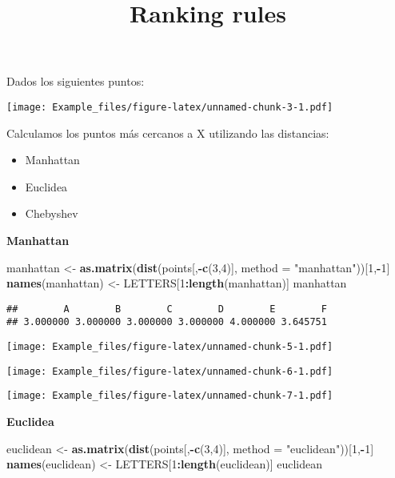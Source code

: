 \documentclass[]{article}
\title{Ranking rules}
\author{}
\date{}
\newenvironment{Shaded}{\begin{snugshade}}{\end{snugshade}}
\newcommand{\DataTypeTok}[1]{\textcolor[rgb]{0.13,0.29,0.53}{#1}}
\newcommand{\DecValTok}[1]{\textcolor[rgb]{0.00,0.00,0.81}{#1}}
\newcommand{\KeywordTok}[1]{\textcolor[rgb]{0.13,0.29,0.53}{\textbf{#1}}}
\newcommand{\NormalTok}[1]{#1}
\newcommand{\OperatorTok}[1]{\textcolor[rgb]{0.81,0.36,0.00}{\textbf{#1}}}
\newcommand{\StringTok}[1]{\textcolor[rgb]{0.31,0.60,0.02}{#1}}
\providecommand{\tightlist}{%
  \setlength{\itemsep}{0pt}\setlength{\parskip}{0pt}}
\begin{document}
\maketitle

Dados los siguientes puntos:

\texttt{[image: Example\_files/figure-latex/unnamed-chunk-3-1.pdf]}

Calculamos los puntos más cercanos a X utilizando las distancias:

\begin{itemize}
\tightlist
\item
  Manhattan
\item
  Euclidea
\item
  Chebyshev
\end{itemize}

\textbf{Manhattan}

\begin{Shaded}
\begin{Highlighting}[]
\NormalTok{manhattan <-}\StringTok{ }\KeywordTok{as.matrix}\NormalTok{(}\KeywordTok{dist}\NormalTok{(points[,}\OperatorTok{-}\KeywordTok{c}\NormalTok{(}\DecValTok{3}\NormalTok{,}\DecValTok{4}\NormalTok{)], }\DataTypeTok{method =} \StringTok{"manhattan"}\NormalTok{))[}\DecValTok{1}\NormalTok{,}\OperatorTok{-}\DecValTok{1}\NormalTok{]}
\KeywordTok{names}\NormalTok{(manhattan) <-}\StringTok{ }\NormalTok{LETTERS[}\DecValTok{1}\OperatorTok{:}\KeywordTok{length}\NormalTok{(manhattan)]}
\NormalTok{manhattan}
\end{Highlighting}
\end{Shaded}

\begin{verbatim}
##        A        B        C        D        E        F 
## 3.000000 3.000000 3.000000 3.000000 4.000000 3.645751
\end{verbatim}

\texttt{[image: Example\_files/figure-latex/unnamed-chunk-5-1.pdf]}

\texttt{[image: Example\_files/figure-latex/unnamed-chunk-6-1.pdf]}

\texttt{[image: Example\_files/figure-latex/unnamed-chunk-7-1.pdf]}

\textbf{Euclidea}

\begin{Shaded}
\begin{Highlighting}[]
\NormalTok{euclidean <-}\StringTok{ }\KeywordTok{as.matrix}\NormalTok{(}\KeywordTok{dist}\NormalTok{(points[,}\OperatorTok{-}\KeywordTok{c}\NormalTok{(}\DecValTok{3}\NormalTok{,}\DecValTok{4}\NormalTok{)], }\DataTypeTok{method =} \StringTok{"euclidean"}\NormalTok{))[}\DecValTok{1}\NormalTok{,}\OperatorTok{-}\DecValTok{1}\NormalTok{]}
\KeywordTok{names}\NormalTok{(euclidean) <-}\StringTok{ }\NormalTok{LETTERS[}\DecValTok{1}\OperatorTok{:}\KeywordTok{length}\NormalTok{(euclidean)]}
\NormalTok{euclidean}
\end{Highlighting}
\end{Shaded}
\end{document}
